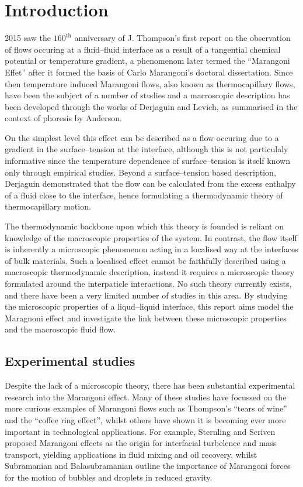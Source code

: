 \section{Introduction}
2015 saw the $160^{\mathrm{th}}$ anniversary of J. Thompson's first report on the observation of flows occuring at a fluid--fluid interface as a result of a tangential chemical potential or temperature gradient, a phenomenom later termed the ``Marangoni Effet'' after it formed the basis of Carlo Marangoni's doctoral dissertation.
Since then temperature induced Marangoni flows, also known as thermocapillary flows, have been the subject of a number of studies and a macroscopic description has been developed through the works of Derjaguin\cite{SurfaceForces} and Levich\cite{Levich}, as summarised in the context of phoresis by Anderson\cite{Anderson}.

On the simplest level this effect can be described as a flow occuring due to a gradient in the surface--tension at the interface, although this is not particulaly informative since the temperature dependence of surface--tension is itself known only through empirical studies.
Beyond a surface--tension based description, Derjaguin demonstrated that the flow can be calculated from the excess enthalpy of a fluid close to the interface, hence formulating a thermodynamic theory of thermocapillary motion.\cite{SurfaceForces}

The thermodynamic backbone upon which this theory is founded is reliant on knowledge of the macroscopic properties of the system.
In contrast, the flow itself is inherently a microscopic phenomenon acting in a localised way at the interfaces of bulk materials. 
Such a localised effect cannot be faithfully described using a macroscopic thermodynamic description, instead it requires a microscopic theory formulated around the interpaticle interactions. 
No such theory currently exists, and there have been a very limited number of studies in this area.\cite{HolgerBoppHampe}
By studying the microscopic properties of a liqud--liquid interface, this report aims model the Maragnoni effect and investigate the link between these microscopic properties and the macroscopic fluid flow.

\subsection{Experimental studies}
Despite the lack of a microscopic theory, there has been substantial experimental research into the Marangoni effect.
Many of these studies have focussed on the more curious examples of Marangoni flows such as Thompson's ``tears of wine''\cite{JThompson,Venerus,Tadmor,Cazabat1995} and the ``coffee ring effect'',\cite{Sefian,HuLarson,Sefiane2014} whilst others have shown it is becoming ever more important in technological applications.
For example, Sternling and Scriven\cite{SternlingScriven} proposed Marangoni effects as the origin for interfacial turbelence and mass transport, yielding applications in fluid mixing and oil recovery, whilst Subramanian and Balasubramanian outline the importance of Marangoni forces for the motion of bubbles and droplets in reduced gravity.\cite{MotionOfBubblesAndDrops} 

